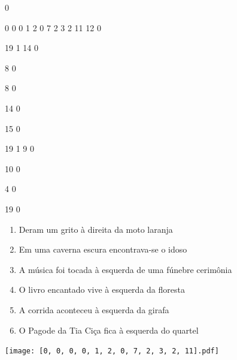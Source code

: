 \documentclass[12pt]{article}
\begin{document}
		\vfill  
		  
{
	0	%

	0	%
	0	%
	0	%
	1	%
	2	%
	0	%
	7	%
	2	%
	3	%
	2	%
	11	%
	12	%
	0	%

	19	%
	1	%
	14	%
	0	%

	8	%
	0	%

	8	%
	0	%

	14	%
	0	%

	15	%
	0	%

	19	%
	1	%
	9	%
	0	%

	10	%
	0	%

	4	%
	0	%

	19	%
	0	%

}	  
		    	

		 

\pagebreak


	\begin{enumerate}
		  \sffamily %
		  \large %


\vfill \item
Deram um grito	%
à direita
da moto laranja	%

\vfill \item
Em uma caverna escura	%
encontrava-se o idoso	%

\vfill \item
A música foi tocada	%
à esquerda
de uma fúnebre cerimônia	%

\vfill \item
O livro encantado vive	%
à esquerda
da floresta	%

\vfill \item
A corrida aconteceu	%
à esquerda
da girafa	%

\vfill \item
O Pagode da Tia Ciça fica	%
à esquerda
do quartel	%
	\end{enumerate}
		  
		  \hfill

		  \vfill

\texttt{[image: [0, 0, 0, 0, 1, 2, 0, 7, 2, 3, 2, 11].pdf]}


	\hfill	  	  
\end{document}
